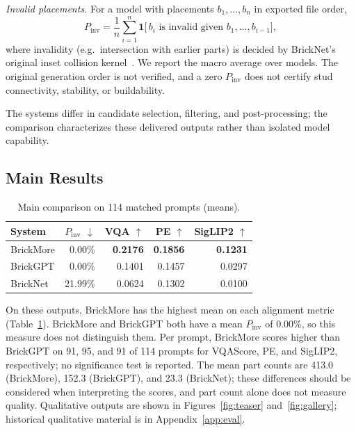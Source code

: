 \documentclass[letterpaper]{article} %
\begin{document}
\emph{Invalid placements.} For a model with placements $b_1,\ldots,b_n$ in exported file order,
\begin{equation}
P_{\mathrm{inv}} = \frac{1}{n}\sum_{i=1}^{n}\mathbf{1}\big[\,b_i \text{ is invalid given } b_1,\ldots,b_{i-1}\big],
\end{equation}
where invalidity (e.g.\ intersection with earlier parts) is decided by BrickNet's original inset collision kernel~\cite{bricknet}. We report the macro average over models. The original generation order is not verified, and a zero $P_{\mathrm{inv}}$ does not certify stud connectivity, stability, or buildability.

The systems differ in candidate selection, filtering, and post-processing; the comparison characterizes these delivered outputs rather than isolated model capability.

\subsection{Main Results}
\begin{table}[t]
\centering
\small
\setlength{\tabcolsep}{4pt}
\begin{tabular}{lrrrr}
\toprule
System & $P_{\mathrm{inv}}$ $\downarrow$ & VQA $\uparrow$ & PE $\uparrow$ & SigLIP2 $\uparrow$ \\
\midrule
BrickMore & 0.00\% & \textbf{0.2176} & \textbf{0.1856} & \textbf{0.1231} \\
BrickGPT & 0.00\% & 0.1401 & 0.1457 & 0.0297 \\
BrickNet & 21.99\% & 0.0624 & 0.1302 & 0.0100 \\
\bottomrule
\end{tabular}
\caption{Main comparison on 114 matched prompts (means).}
\label{tab:main}
\end{table}
On these outputs, BrickMore has the highest mean on each alignment metric (Table~\ref{tab:main}). BrickMore and BrickGPT both have a mean $P_{\mathrm{inv}}$ of 0.00\%, so this measure does not distinguish them. Per prompt, BrickMore scores higher than BrickGPT on 91, 95, and 91 of 114 prompts for VQAScore, PE, and SigLIP2, respectively; no significance test is reported. The mean part counts are 413.0 (BrickMore), 152.3 (BrickGPT), and 23.3 (BrickNet); these differences should be considered when interpreting the scores, and part count alone does not measure quality. Qualitative outputs are shown in Figures~\ref{fig:teaser} and~\ref{fig:gallery}; historical qualitative material is in Appendix~\ref{app:eval}.
\end{document}
